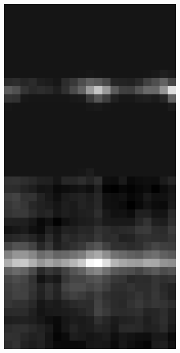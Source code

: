\documentclass[10pt, letter]{article}
\begin{document}
			\begin{figure}[h!]
				\centering
				\begin{subfigure}[t]{0.18\textwidth}
					\centering
					\includegraphics[width=\textwidth]{figures/inv1}
				\end{subfigure}	

\end{figure}
\end{document}
